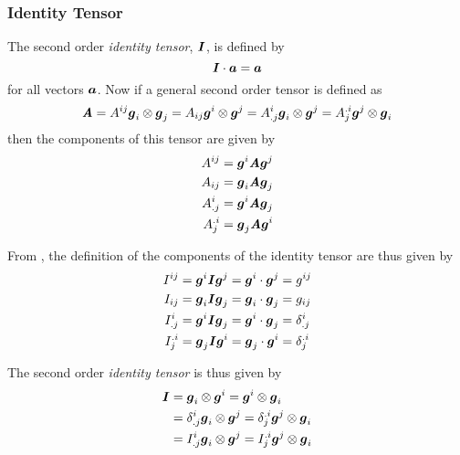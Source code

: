 \subsubsection{Identity Tensor}
\label{subsubsec:IdentityTensorSecondOrder}

The second order \emph{identity tensor}, $  \boldsymbol{\mathit{ I }}  $, is defined by
\begin{equation}
  \dotprod{\identitytensortwo}{\vectr{a}}=\vectr{a}
  \label{eqn:DefinitionIdentitySecondOrder}
\end{equation}
for all vectors $ \boldsymbol{a} $. Now if a general second order tensor is defined
as
\begin{equation}
  \boldsymbol{\mathit{A}}=A^{ij}  \boldsymbol{g} _{i} \otimes  \boldsymbol{g} _{j} =A_{ij}  \boldsymbol{g} ^{i} \otimes  \boldsymbol{g} ^{j} =A^{i}_{.j}  \boldsymbol{g} _{i} \otimes  \boldsymbol{g} ^{j} =A^{.i}_{j}  \boldsymbol{g} ^{j} \otimes  \boldsymbol{g} _{i} 
\end{equation}
then the components of this tensor are given by
\begin{equation}
  \begin{aligned}
    A^{ij}&= \boldsymbol{g} ^{i}\boldsymbol{\mathit{A}} \boldsymbol{g} ^{j} \\
    A_{ij}&= \boldsymbol{g} _{i}\boldsymbol{\mathit{A}} \boldsymbol{g} _{j} \\
    A^{i}_{.j}&= \boldsymbol{g} ^{i}\boldsymbol{\mathit{A}} \boldsymbol{g} _{j} \\
    A^{.i}_{j}&= \boldsymbol{g} _{j}\boldsymbol{\mathit{A}} \boldsymbol{g} ^{i}    
  \end{aligned}
\end{equation}

From , the definition of the components of the identity tensor are thus given by
\begin{equation}
  \begin{aligned}
    I^{ij}&= \boldsymbol{g} ^{i}\boldsymbol{\mathit{I}} \boldsymbol{g} ^{j}=  \boldsymbol{g} ^{i}  \cdot   \boldsymbol{g} ^{j} =g^{ij} \\
    I_{ij}&= \boldsymbol{g} _{i}\boldsymbol{\mathit{I}} \boldsymbol{g} _{j}=  \boldsymbol{g} _{i}  \cdot   \boldsymbol{g} _{j} =g_{ij}  \\
    I^{i}_{.j}&= \boldsymbol{g} ^{i}\boldsymbol{\mathit{I}} \boldsymbol{g} _{j}=  \boldsymbol{g} ^{i}  \cdot   \boldsymbol{g} _{j} = \delta^{i}_{.j}  \\
    I^{.i}_{j}&= \boldsymbol{g} _{j}\boldsymbol{\mathit{I}} \boldsymbol{g} ^{i}=  \boldsymbol{g} _{j}  \cdot   \boldsymbol{g} ^{i} = \delta^{.i}_{j}     
  \end{aligned}
\end{equation}

The second order \emph{identity tensor} is thus given by
\begin{equation}
  \begin{aligned}
      \boldsymbol{\mathit{ I }}  &=  \boldsymbol{g} _{i} \otimes  \boldsymbol{g} ^{i} =  \boldsymbol{g} ^{i} \otimes  \boldsymbol{g} _{i} \\
    &= \delta^{i}_{.j}   \boldsymbol{g} _{i} \otimes  \boldsymbol{g} ^{j} = \delta^{.i}_{j}   \boldsymbol{g} ^{j} \otimes  \boldsymbol{g} _{i} \\
    &=I^{i}_{.j}  \boldsymbol{g} _{i} \otimes  \boldsymbol{g} ^{j} =I^{.i}_{j}  \boldsymbol{g} ^{j} \otimes  \boldsymbol{g} _{i} 
  \end{aligned}
\end{equation}

